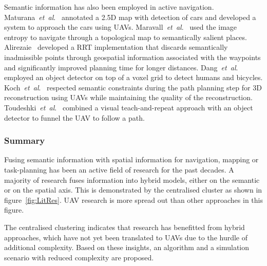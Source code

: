 \documentclass[twocolumn,letterpaper]{IEEEAerospaceCLS}  %
\newcommand{\abbreviation}[1]{\emph{#1}.}
\newcommand{\etal}{\abbreviation{et~al}}
\begin{document}
Semantic information has also been employed in active navigation. Maturana~\etal~\cite{maturana_looking_2017} annotated a 2.5D map with detection of cars and developed a system to approach the cars using UAVs. Maravall~\etal~\cite{maravall_navigation_2017} used the image entropy to navigate through a topological map to semantically salient places. Alirezaie~\cite{alirezaie_exploiting_2017} developed a RRT implementation that discards semantically inadmissible points through geospatial information associated with the waypoints and significantly improved planning time for longer distances. Dang~\etal~\cite{dang_autonomous_2018} employed an object detector on top of a voxel grid to detect humans and bicycles. Koch~\etal~\cite{koch_automatic_2019} respected semantic constraints during the path planning step for 3D reconstruction using UAVs while maintaining the quality of the reconstruction.
Toudeshki~\etal~\cite{toudeshki_robust_2018} combined a visual teach-and-repeat approach with an object detector to funnel the UAV to follow a path.
\subsubsection{Summary} \label{sssec:ResLitSum}
Fusing semantic information with spatial information for navigation, mapping or task-planning has been an active field of research for the past decades. A majority of research fuses information into hybrid models, either on the semantic or on the spatial axis. This is demonstrated by the centralised cluster as shown in figure~\ref{fig:LitRes}. UAV research is more spread out than other approaches in this figure.

The centralised clustering indicates that research has benefitted from hybrid approaches, which have not yet been translated to UAVs due to the hurdle of additional complexity. Based on these insights, an algorithm and a simulation scenario with reduced complexity are proposed.
\end{document}
